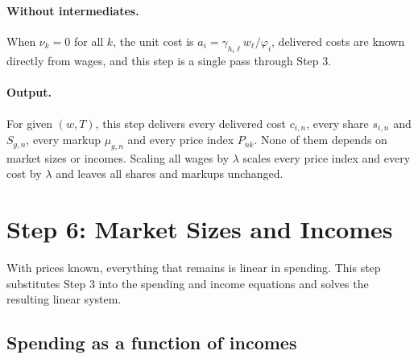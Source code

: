 \documentclass[11pt]{article}
\theoremstyle{remark}
\begin{document}
\paragraph{Without intermediates.} When $\nu_k=0$ for all $k$, the unit cost is
$a_i=\gamma_{h_i\ell}w_\ell/\varphi_i$, delivered costs are known directly from wages,
and this step is a single pass through Step 3.

\paragraph{Output.} For given $(w,T)$, this step delivers every delivered cost
$c_{i,n}$, every share $s_{i,n}$ and $S_{g,n}$, every markup $\mu_{g,n}$ and every
price index $P_{nk}$. None of them depends on market sizes or incomes. Scaling all
wages by $\lambda$ scales every price index and every cost by $\lambda$ and leaves all
shares and markups unchanged.

\section{Step 6: Market Sizes and Incomes}
\label{sec:incomes}

With prices known, everything that remains is linear in spending. This step
substitutes Step 3 into the spending and income equations and solves the resulting
linear system.

\subsection{Spending as a function of incomes}
\end{document}
